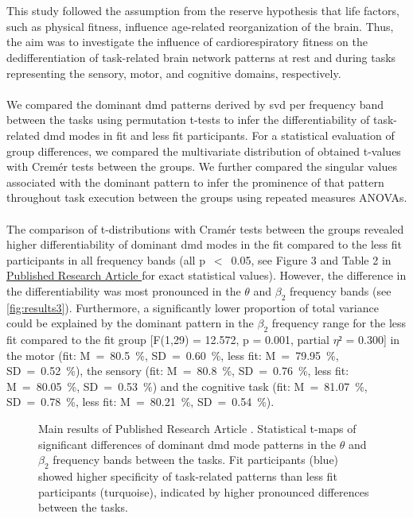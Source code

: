 \hyperref[pub:paperIII]{}\\
\\
This study followed the assumption from the reserve hypothesis that life factors, such as physical fitness, influence age-related reorganization of the brain. Thus, the aim was to investigate the influence of cardiorespiratory fitness on the dedifferentiation of task-related brain network patterns at rest and during tasks representing the sensory, motor, and cognitive domains, respectively.\\
\\
We compared the dominant \gls{dmd} patterns derived by \gls{svd} per frequency band between the tasks using permutation t-tests to infer the differentiability of task-related \gls{dmd} modes in fit and less fit participants. For a statistical evaluation of group differences, we compared the multivariate distribution of obtained t-values with Cremér tests between the groups. We further compared the singular values associated with the dominant pattern to infer the prominence of that pattern throughout task execution between the groups using repeated measures ANOVAs.\\
\\
The comparison of t-distributions with Cramér tests between the groups revealed higher differentiability of dominant \gls{dmd} modes in the fit compared to the less fit participants in all frequency bands (all p~$<$~0.05, see Figure 3 and Table 2 in \hyperref[pub:paperIII]{Published Research Article } for exact statistical values). However, the difference in the differentiability was most pronounced in the $\theta$ and $\beta_2$ frequency bands (see \autoref{fig:results3}). Furthermore, a significantly lower proportion of total variance could be explained by the dominant pattern in the $\beta_2$ frequency range for the less fit compared to the fit group [F(1,29) = 12.572, p = 0.001, partial $\eta²$ = 0.300] in the motor (fit: M~=~80.5~\%, SD~=~0.60~\%, less fit: M~=~79.95~\%, SD~=~0.52~\%), the sensory (fit: M~=~80.8~\%, SD~=~0.76~\%, less fit: M~=~80.05~\%, SD~=~0.53~\%) and the cognitive task (fit: M~=~81.07~\%, SD~=~0.78~\%, less fit: M~=~80.21~\%, SD~=~0.54~\%).\\

\begin{figure}[ht]
    \centering
    
    \caption[Main results of Published Research Article ]{Main results of Published Research Article . Statistical t-maps of significant differences of dominant \gls{dmd} mode patterns in the $\theta$ and $\beta_2$ frequency bands between the tasks. Fit participants (blue) showed higher specificity of task-related patterns than less fit participants (turquoise), indicated by higher pronounced differences between the tasks.}
    \label{fig:results3}
\end{figure}

